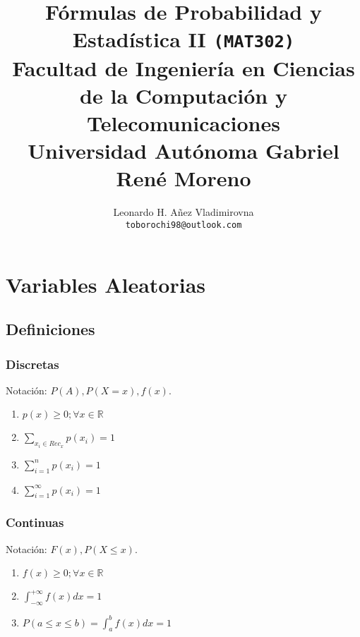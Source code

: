 \documentclass[10pt,letterpaper]{article}
\author{Leonardo H. Añez Vladimirovna\\
\texttt{toborochi98@outlook.com}
}
\title{Fórmulas de Probabilidad y Estadística II \texttt{(MAT302)}\\{\normalsize Facultad de Ingeniería en Ciencias de la Computación y Telecomunicaciones}\\{\normalsize Universidad Autónoma Gabriel René Moreno}}
\begin{document}
\maketitle

\section{Variables Aleatorias}
\subsection{Definiciones}
\begin{multicols}{2}
\subsubsection{Discretas}
\begin{flushleft}
Notación:  $P(A),P(X=x),f(x)$.
\begin{enumerate}
\item $p(x)\geq 0 ; \forall x \in \mathbb{R}$
\item $\displaystyle\sum_{x_i\in Rec_x} p(x_i)=1$
\item $\displaystyle\sum_{i=1}^{n} p(x_i)=1$
\item $\displaystyle\sum_{i=1}^{\infty} p(x_i)=1$
\end{enumerate}
\end{flushleft}
\columnbreak
\subsubsection{Continuas}
\begin{flushleft}
Notación:  $F(x),P(X\leq x)$.
\begin{enumerate}
\item $f(x)\geq 0;\forall x \in \mathbb{R}$
\item $\displaystyle\int_{-\infty}^{+\infty} f(x)dx = 1$
\item $P(a\leq x \leq b) = \displaystyle\int_{a}^{b} f(x)dx=1$
\end{enumerate}
\end{flushleft}
\end{multicols}
\end{document}
